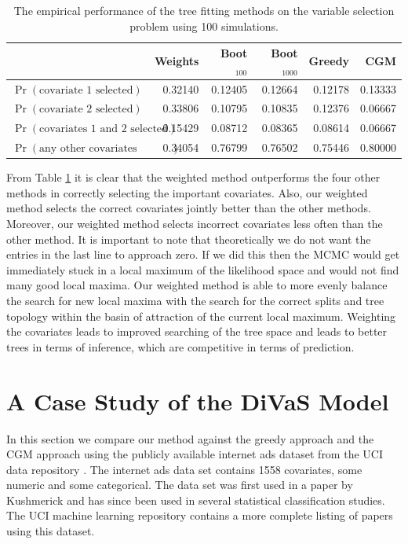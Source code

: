 
\begin{table}[ht]
\begin{center}
\begin{tabular}{l | rrrrr}
  \hline
  & Weights & Boot$_{100}$ & Boot$_{1000}$ & Greedy & CGM \\ 
  \hline
$\Pr(\text{covariate 1 selected})$ & 0.32140 & 0.12405 & 0.12664 & 0.12178 & 0.13333 \\ 
$\Pr(\text{covariate 2 selected})$ & 0.33806 & 0.10795 & 0.10835 & 0.12376 & 0.06667 \\ 
  $\Pr(\text{covariates 1 and 2 selected})$& 0.15429 & 0.08712 & 0.08365 & 0.08614 & 0.06667 \\ 
  $\Pr(\text{any other covariates  selected})$ & 0.34054 & 0.76799 & 0.76502 & 0.75446 & 0.80000 \\ 
   \hline
\end{tabular}
 \caption[Empirical covariate selection with 100 simulations]{The empirical performance of the tree fitting methods on the variable selection problem using 100 simulations.}
 \label{tab:sim_study}
 \end{center}
\end{table}


From Table \ref{tab:sim_study} it is clear that the weighted method outperforms the four other methods in correctly selecting the important covariates. Also, our weighted method selects the correct covariates jointly better than the other methods. Moreover, our weighted method selects incorrect covariates less often than the other method. It is important to note that theoretically we do not want the entries in the last line to approach zero. If we did this then the MCMC would get immediately stuck in a local maximum of the likelihood space and would not find many good local maxima. Our weighted method is able to more evenly balance the search for new local maxima with the search for the correct splits and tree topology within the basin of attraction of the current local maximum. Weighting the covariates leads to improved searching of the tree space and leads to better trees in terms of inference, which are competitive in terms of prediction.  

\newpage

\chapter{A Case Study of the DiVaS Model}\label{sec:real_data}
In this section we compare our method against the greedy approach and the CGM approach using the publicly available internet ads dataset from the UCI data repository \cite{Frank:2010uq}. The internet ads data set contains 1558 covariates, some numeric and some categorical. The data set was first used in a paper by Kushmerick \cite{kushmerick1999learning} and has since been used in several statistical classification studies. The UCI machine learning repository contains a more complete listing of papers using this dataset. 

